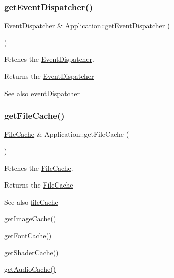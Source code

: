 \subsubsection{\texorpdfstring{getEventDispatcher()}{getEventDispatcher()}}
{\footnotesize\ttfamily \mbox{\hyperlink{classsage_1_1EventDispatcher}{Event\+Dispatcher}} \& Application\+::get\+Event\+Dispatcher (\begin{DoxyParamCaption}{ }\end{DoxyParamCaption})}



Fetches the \mbox{\hyperlink{classsage_1_1EventDispatcher}{Event\+Dispatcher}}. 

\begin{DoxyReturn}{Returns}
the \mbox{\hyperlink{classsage_1_1EventDispatcher}{Event\+Dispatcher}} 
\end{DoxyReturn}
\begin{DoxySeeAlso}{See also}
\mbox{\hyperlink{classsage_1_1Application_ae7cbe4333c8c285fb78fa6d561090281}{event\+Dispatcher}} 
\end{DoxySeeAlso}
\mbox{\label{classsage_1_1Application_adaacf80b3ecc3efdd4696b869ca3aedd}} 
\subsubsection{\texorpdfstring{getFileCache()}{getFileCache()}}
{\footnotesize\ttfamily \mbox{\hyperlink{classsage_1_1FileCache}{File\+Cache}} \& Application\+::get\+File\+Cache (\begin{DoxyParamCaption}{ }\end{DoxyParamCaption})}



Fetches the \mbox{\hyperlink{classsage_1_1FileCache}{File\+Cache}}. 

\begin{DoxyReturn}{Returns}
the \mbox{\hyperlink{classsage_1_1FileCache}{File\+Cache}} 
\end{DoxyReturn}
\begin{DoxySeeAlso}{See also}
\mbox{\hyperlink{classsage_1_1Application_adaaeb004710d17aaff977ba58acaa9a5}{file\+Cache}} 

\mbox{\hyperlink{classsage_1_1Application_a6659ce3fdb899bee814c0628dcbcc423}{get\+Image\+Cache()}} 

\mbox{\hyperlink{classsage_1_1Application_a325c4ae42e7c7adbb435d68be16f20e7}{get\+Font\+Cache()}} 

\mbox{\hyperlink{classsage_1_1Application_a2968bb7e8ae2247aa49d1092f24a751a}{get\+Shader\+Cache()}} 

\mbox{\hyperlink{classsage_1_1Application_a68d5ca5d6fd24fa3ec8354e8ec62227a}{get\+Audio\+Cache()}} 
\end{DoxySeeAlso}
\mbox{\label{classsage_1_1Application_a325c4ae42e7c7adbb435d68be16f20e7}} 

